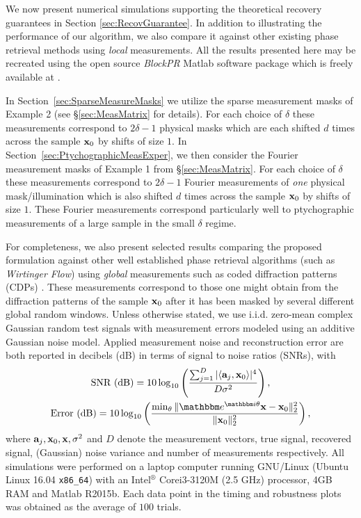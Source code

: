 We now present numerical simulations supporting the theoretical recovery guarantees in Section
\ref{sec:RecovGuarantee}.  In addition to illustrating the performance of our algorithm, we also compare it against other
existing phase retrieval methods using {\em local} measurements. All the results
presented here may be recreated using the open source {\em BlockPR} Matlab software package which is
freely available at \cite{bitbucket_BlockPR}.

In Section~\ref{sec:SparseMeasureMasks} we utilize the sparse measurement masks of Example 2 (see \S \ref{sec:MeasMatrix} for details). For each choice of $\delta$ these measurements correspond to $2\delta - 1$ physical masks which are each shifted $d$ times across the sample $\mathbf x_0$ by shifts of size $1$. In Section~\ref{sec:PtychographicMeasExper}, we then consider the Fourier measurement masks of Example 1 from \S \ref{sec:MeasMatrix}. For each choice of $\delta$ these measurements correspond to $2\delta - 1$ Fourier measurements of {\em one} physical mask/illumination which is also shifted $d$ times across the sample $\mathbf x_0$ by shifts of size $1$. These Fourier measurements correspond particularly well to ptychographic measurements of a large sample in the small $\delta$ regime.

For completeness, we also present selected results comparing the proposed formulation against other
well established phase retrieval algorithms (such as {\em Wirtinger Flow}) using {\em global}
measurements such as coded diffraction patterns (CDPs) \cite[\S 1.5]{Candes2014WF}.  These
measurements correspond to those one might obtain from the diffraction patterns of the sample $\mathbf x_0$
after it has been masked by several different global random windows. Unless otherwise stated, we use
i.i.d.  zero-mean complex Gaussian random test signals with measurement errors modeled using an
additive Gaussian noise model. Applied measurement noise and reconstruction error are both reported
in decibels (dB) in terms of signal to noise ratios (SNRs), with 
%
\begin{gather*}  \mbox{SNR (dB)} = 10 \log_{10} \left( 
        \frac{\sum_{j=1}^D\vert \langle \a_j, \x_0 \rangle \vert ^4}
            {D\sigma^2} \right), \\
    \mbox{Error (dB)} = 10 \log_{10} \left( \frac{\min_\theta \|\ee^{\ii \theta} \x - 
	\x_0 \|_2^2}{\| \x_0 \|^2_2}\right),  \end{gather*}
%
where $\mathbf a_j, \mathbf x_0, \mathbf x, \sigma^2$ and $D$ denote the measurement vectors, true signal, recovered
signal, (Gaussian) noise variance and number of measurements respectively.  All simulations were
performed on a laptop computer running GNU/Linux (Ubuntu Linux 16.04 \verb|x86_64|) with an
Intel$^\circledR$ Core\texttrademark i3-3120M (2.5 GHz) processor, 4GB RAM and Matlab R2015b. Each
data point in the timing and robustness plots was obtained as the average of $100$ trials.

